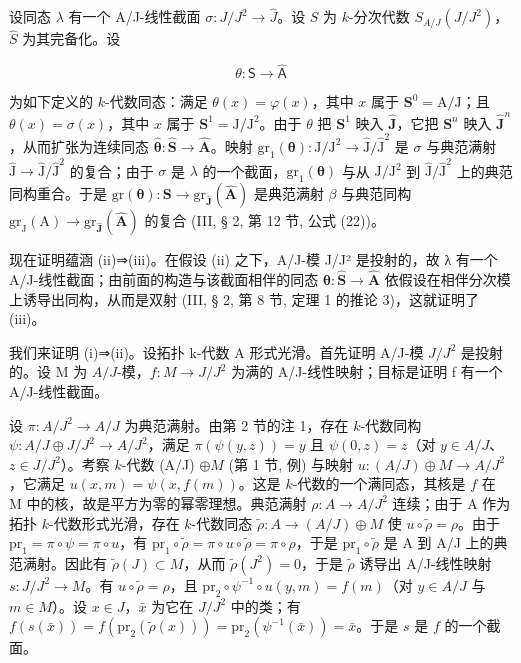设同态 \(\lambda\) 有一个 A/J-线性截面 \(\sigma : J/J^{2} \longrightarrow \widehat{J}\)。设 \(S\) 为 \(k\)-分次代数 \(S_{A/J}(J/J^{2})\)，\(\widehat{S}\) 为其完备化。设

\[
\theta : \mathsf {S} \to \widehat {\mathsf {A}}
\]

为如下定义的 \(k\)-代数同态：满足 \(\theta(x) = \varphi(x)\)，其中 \(x\) 属于 \(\mathbf{S}^0 = \mathrm{A}/\mathrm{J}\)；且 \(\theta(x) = \sigma(x)\)，其中 \(x\) 属于 \(\mathbf{S}^1 = \mathrm{J}/\mathrm{J}^2\)。由于 \(\theta\) 把 \(\mathbf{S}^1\) 映入 \(\widehat{\mathbf{J}}\)，它把 \(\mathbf{S}^n\) 映入 \(\widehat{\mathbf{J}}^n\)，从而扩张为连续同态 \(\widehat{\boldsymbol{\theta}}: \widehat{\mathbf{S}} \to \widehat{\mathbf{A}}\)。映射 \(\mathrm{gr}_1(\boldsymbol{\theta}): \mathrm{J}/\mathrm{J}^2 \longrightarrow \widehat{\mathrm{J}}/\widehat{\mathrm{J}}^2\) 是 \(\sigma\) 与典范满射 \(\widehat{\mathrm{J}} \longrightarrow \widehat{\mathrm{J}}/\widehat{\mathrm{J}}^2\) 的复合；由于 \(\sigma\) 是 \(\lambda\) 的一个截面，\(\mathrm{gr}_1(\boldsymbol{\theta})\) 与从 \(\mathrm{J}/\mathrm{J}^2\) 到 \(\widehat{\mathrm{J}}/\widehat{\mathrm{J}}^2\) 上的典范同构重合。于是 \(\mathrm{gr}(\boldsymbol{\theta}): \mathbf{S} \to \mathrm{gr}_{\widehat{\mathbf{J}}}(\widehat{\mathbf{A}})\) 是典范满射 \(\beta\) 与典范同构 \(\mathrm{gr}_\mathrm{J}(\mathrm{A}) \to \mathrm{gr}_{\widehat{\mathbf{J}}}(\widehat{\mathbf{A}})\) 的复合 (III, § 2, 第 12 节, 公式 (22))。

现在证明蕴涵 (ii)⇒(iii)。在假设 (ii) 之下，A/J-模 J/J² 是投射的，故 λ 有一个 A/J-线性截面；由前面的构造与该截面相伴的同态 \(\widehat{\boldsymbol{\theta}}:\widehat{\mathbf{S}}\to\widehat{\mathbf{A}}\) 依假设在相伴分次模上诱导出同构，从而是双射 (III, § 2, 第 8 节, 定理 1 的推论 3)，这就证明了 (iii)。

我们来证明 (i)⇒(ii)。设拓扑 k-代数 A 形式光滑。首先证明 A/J-模 \(J/J^{2}\) 是投射的。设 M 为 \(A/J\)-模，\(f:M\to J/J^{2}\) 为满的 A/J-线性映射；目标是证明 f 有一个 A/J-线性截面。

设 \(\pi: A/J^{2} \to A/J\) 为典范满射。由第 2 节的注 1，存在 \(k\)-代数同构 \(\psi: A/J \oplus J/J^{2} \longrightarrow A/J^{2}\)，满足 \(\pi(\psi(y,z)) = y\) 且 \(\psi(0,z) = z\)（对 \(y \in A/J\)、\(z \in J/J^{2}\)）。考察 \(k\)-代数 (A/J) \(\oplus M\) (第 1 节, 例) 与映射 \(u: (A/J) \oplus M \to A/J^{2}\)，它满足 \(u(x,m) = \psi(x,f(m))\)。这是 \(k\)-代数的一个满同态，其核是 \(f\) 在 M 中的核，故是平方为零的幂零理想。典范满射 \(\rho: A \to A/J^{2}\) 连续；由于 A 作为拓扑 \(k\)-代数形式光滑，存在 \(k\)-代数同态 \(\tilde{\rho}: A \to (A/J) \oplus M\) 使 \(u \circ \tilde{\rho} = \rho\)。由于 \(\mathrm{pr}_{1} = \pi \circ \psi = \pi \circ u\)，有 \(\mathrm{pr}_{1} \circ \tilde{\rho} = \pi \circ u \circ \tilde{\rho} = \pi \circ \rho\)，于是 \(\mathrm{pr}_{1} \circ \tilde{\rho}\) 是 A 到 A/J 上的典范满射。因此有 \(\tilde{\rho}(J) \subset M\)，从而 \(\tilde{\rho}(J^{2}) = 0\)，于是 \(\tilde{\rho}\) 诱导出 A/J-线性映射 \(s: J/J^{2} \to M\)。有 \(u \circ \tilde{\rho} = \rho\)，且 \(\mathrm{pr}_{2} \circ \psi^{-1} \circ u(y,m) = f(m)\)（对 \(y \in A/J\) 与 \(m \in M\)）。设 \(x \in J\)，\(\bar{x}\) 为它在 \(J/J^{2}\) 中的类；有 \(f(s(\bar{x})) = f(\mathrm{pr}_{2}(\tilde{\rho}(x))) = \mathrm{pr}_{2}(\psi^{-1}(\bar{x})) = \bar{x}\)。于是 \(s\) 是 \(f\) 的一个截面。

